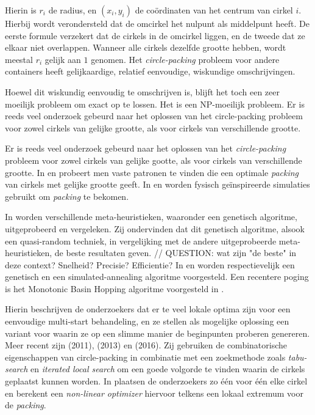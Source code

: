 \documentclass[12pt,a4paper,oneside]{book}
\begin{document}
Hierin is $r_i$ de radius, en $(x_i,y_i)$ de coördinaten van het centrum van cirkel $i$.
Hierbij wordt verondersteld dat de omcirkel het nulpunt als middelpunt heeft.
De eerste formule verzekert dat de cirkels in de omcirkel liggen, en de tweede dat ze elkaar niet overlappen.
Wanneer alle cirkels dezelfde grootte hebben, wordt meestal $r_i$ gelijk aan $1$ genomen.
Het \textit{circle-packing} probleem voor andere containers heeft gelijkaardige, relatief eenvoudige, wiskundige omschrijvingen.

Hoewel dit wiskundig eenvoudig te omschrijven is, blijft het toch een zeer moeilijk probleem om exact op te lossen.
Het is een NP-moeilijk probleem. Er is reeds veel onderzoek gebeurd naar het oplossen van het circle-packing probleem voor zowel cirkels van gelijke grootte, als voor cirkels van verschillende grootte.

Er is reeds veel onderzoek gebeurd naar het oplossen van het \textit{circle-packing} probleem voor zowel cirkels van gelijke gootte, als voor cirkels van verschillende grootte.
In \cite{graham1996repeated} en \cite{lubachevsky1997curved} probeert men vaste patronen te vinden die een optimale \textit{packing} van cirkels met gelijke grootte geeft.
In \cite{graham1998dense} en \cite{wang2002improved} worden fysisch geïnspireerde simulaties gebruikt om \textit{packing} te bekomen.

In \cite{george1995packing} worden verschillende meta-heuristieken, waaronder een genetisch algoritme, uitgeprobeerd en vergeleken.
Zij ondervinden dat dit genetisch algoritme, alsook een quasi-random techniek, in vergelijking met de andere uitgeprobeerde meta-heuristieken, de beste resultaten geven. // QUESTION: wat zijn "de beste" in deze context? Snelheid? Precisie? Efficientie?
In \cite{hifi2004approximate} en \cite{hifi2004simulated} worden respectievelijk een genetisch en een simulated-annealing algoritme voorgesteld.
Een recentere poging is het Monotonic Basin Hopping algoritme voorgesteld in \cite{grosso2010}.

Hierin beschrijven de onderzoekers dat er te veel lokale optima zijn voor een eenvoudige multi-start behandeling, en ze stellen als mogelijke oplossing een variant voor waarin ze op een slimme manier de beginpunten proberen genereren.
Meer recent zijn \cite{jors2011} (2011), \cite{ye2013iterated} (2013) en \cite{zeng2016iterated} (2016).
Zij gebruiken de combinatorische eigenschappen van circle-packing in combinatie met een zoekmethode zoals \textit{tabu-search} en \textit{iterated local search} om een goede volgorde te vinden waarin de cirkels geplaatst kunnen worden.
In \cite{jors2011} plaatsen de onderzoekers zo één voor één elke cirkel en berekent een \textit{non-linear optimizer} hiervoor telkens een lokaal extremum voor de \textit{packing}.
\end{document}
